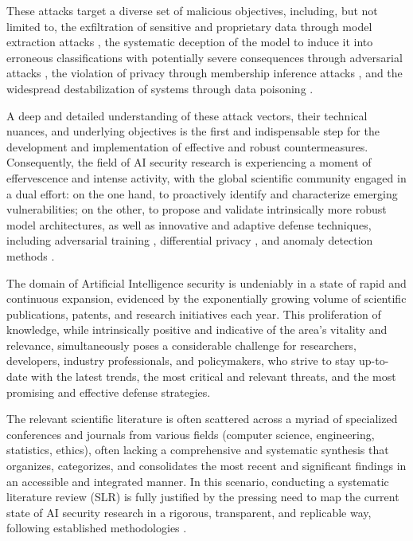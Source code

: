 \documentclass[twoside,brazilian,english]{UNISINOSmonografia}
\begin{document}
These attacks target a diverse set of malicious objectives, including, but not limited to, the exfiltration of sensitive and proprietary data through model extraction attacks \cite{Tramer2016}, the systematic deception of the model to induce it into erroneous classifications with potentially severe consequences through adversarial attacks \cite{Carlini2017}, the violation of privacy through membership inference attacks \cite{Shokri2017}, and the widespread destabilization of systems through data poisoning \cite{Biggio2012, Gu2017}.

A deep and detailed understanding of these attack vectors, their technical nuances, and underlying objectives is the first and indispensable step for the development and implementation of effective and robust countermeasures. Consequently, the field of AI security research is experiencing a moment of effervescence and intense activity, with the global scientific community engaged in a dual effort: on the one hand, to proactively identify and characterize emerging vulnerabilities; on the other, to propose and validate intrinsically more robust model architectures, as well as innovative and adaptive defense techniques, including adversarial training \cite{Zhang2019}, differential privacy \cite{Abadi2016}, and anomaly detection methods \cite{Ma2018}.

The domain of Artificial Intelligence security is undeniably in a state of rapid and continuous expansion, evidenced by the exponentially growing volume of scientific publications, patents, and research initiatives each year. This proliferation of knowledge, while intrinsically positive and indicative of the area's vitality and relevance, simultaneously poses a considerable challenge for researchers, developers, industry professionals, and policymakers, who strive to stay up-to-date with the latest trends, the most critical and relevant threats, and the most promising and effective defense strategies.

The relevant scientific literature is often scattered across a myriad of specialized conferences and journals from various fields (computer science, engineering, statistics, ethics), often lacking a comprehensive and systematic synthesis that organizes, categorizes, and consolidates the most recent and significant findings in an accessible and integrated manner. In this scenario, conducting a systematic literature review (SLR) is fully justified by the pressing need to map the current state of AI security research in a rigorous, transparent, and replicable way, following established methodologies \cite{Kitchenham2007, Petersen2008}.
\end{document}
